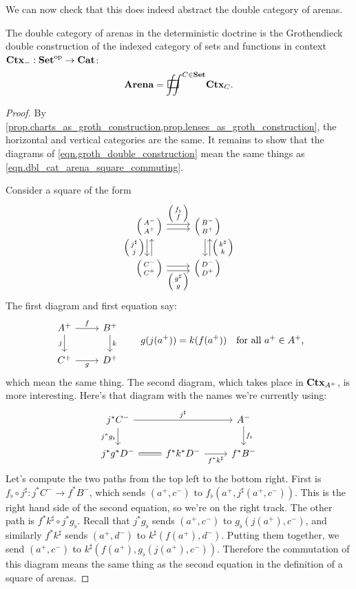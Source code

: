 \documentclass[DynamicalBook]{subfiles}
\begin{document}
We can now check that this does indeed abstract the double category of arenas.

\begin{proposition}\label{prop.arenas_double_groth_contextual_maps}
  The double category of arenas in the deterministic doctrine is the
  Grothendieck double construction of the indexed category of sets and functions
  in context $\textbf{Ctx}_{-} : \textbf{Set}^{\textnormal{op}} \to \textbf{Cat}$:
$$\Cat{Arena} = \sqiint^{C \in \smset} \smctx{C}.$$ 
\end{proposition}
\begin{proof}
  By \cref{prop.charts_as_groth_construction,prop.lenses_as_groth_construction},
  the horizontal and vertical categories are the same. It remains to show that
  the diagrams of \cref{eqn.groth_double_construction} mean the same things as
  \cref{eqn.dbl_cat_arena_square_commuting}.

  Consider a square of the form
  \[
    \begin{tikzcd}
      \lens{A^-}{A^+} \ar[r, shift left, "\lens{f_{\flat}}{f}"] \ar[r, shift
      right] \ar[d, shift right, "\lens{j^{\sharp}}{j}"'] \ar[d, shift left,
      leftarrow] & \lens{B^-}{B^+} \ar[d, shift left, leftarrow,
      "\lens{k^{\sharp}}{k}"] \ar[d, shift right]\\
      \lens{C^-}{C^+} \ar[r, shift right, "\lens{g^{\sharp}}{g}"'] \ar[r, shift
      left] & \lens{D^-}{D^+}
    \end{tikzcd}
  \]
  The first diagram and first equation say:
  \[
    \begin{tikzcd}
      A^+ \ar[d, "j"'] \ar[r, "f"] & B^+ \ar[d, "k"] \\
      C^+ \ar[r, "g"'] & D^+
    \end{tikzcd}
    \quad\quad g(j(a^+)) = k(f(a^+)) \quad\mbox{for all $a^+ \in A^+$,}
  \]
  which mean the same thing. The second diagram, which takes place in
  $\textbf{Ctx}_{A^+}$, is more interesting. Here's that diagram with the names we're
  currently using:
  \[
    \begin{tikzcd}
      j^{\ast} C^- \arrow[rr, "j^{\sharp}"] \arrow[d, "j^{\ast}g_{\flat}"'] &
      &  A^- \arrow[d, "f_{\flat}"] \\
      j^{\ast}g^{\ast}D^- \arrow[r, equals] & f^{\ast}k^{\ast}D^- \arrow[r,
      "f^{\ast}k^{\sharp}"'] & f^{\ast}B^-
    \end{tikzcd}
  \]
  Let's compute the two paths from the top left to the bottom right. First is
  $f_{\flat} \circ j^{\sharp} : j^{\ast} C^- \to f^{\ast}B^-$, which sends
  $(a^+, c^-)$ to $f_{\flat}(a^+, j^{\sharp}(a^+, c^-))$. This is the right hand
  side of the second equation, so we're on the right track. The other path is
  $f^{\ast}k^{\sharp} \circ j^{\ast}g_{\flat}$. Recall that $j^{\ast}g_{\flat}$
  sends $(a^+, c^-)$ to $g_{\flat}(j(a^+), c^-)$, and similarly
  $f^{\ast}k^{\sharp}$ sends $(a^+, d^-)$ to $k^{\sharp}(f(a^+), d^-)$. Putting
  them together, we send $(a^+, c^-)$ to $k^{\sharp}(f(a^+), g_{\flat}(j(a^+),
  c^-))$. Therefore the commutation of this diagram means the same thing as the
  second equation in the definition of a square of arenas.
\end{proof}
\end{document}
